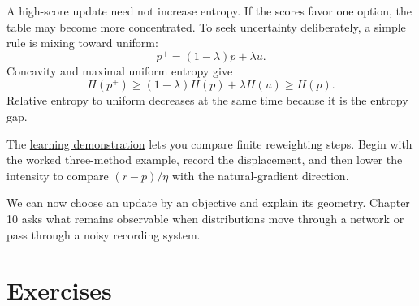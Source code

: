 \documentclass[11pt,oneside,openany]{book}
\theoremstyle{definition}
\theoremstyle{remark}
\numberwithin{equation}{chapter}
\begin{document}
A high-score update need not increase entropy. If the scores favor one option, the table may become more concentrated. To seek uncertainty deliberately, a simple rule is mixing toward uniform: \[p^+=(1-\lambda)p+\lambda u.\] Concavity and maximal uniform entropy give \[H(p^+)\geq(1-\lambda)H(p)+\lambda H(u)\geq H(p).\] Relative entropy to uniform decreases at the same time because it is the entropy gap.

The \href{https://bobovski66.github.io/IntroDiscreteInfoGeom/demos/week09.html}{learning demonstration} lets you compare finite reweighting steps. Begin with the worked three-method example, record the displacement, and then lower the intensity to compare \((r-p)/\eta\) with the natural-gradient direction.

We can now choose an update by an objective and explain its geometry. Chapter 10 asks what remains observable when distributions move through a network or pass through a noisy recording system.

\section{Exercises}\label{ch09-exercises}
\end{document}
